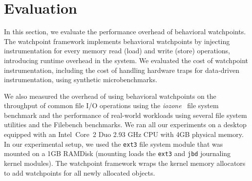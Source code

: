 \section{Evaluation}\label{sec:approach_eval}
In this section, we evaluate the performance overhead of behavioral watchpoints. The watchpoint framework implements behavioral watchpoints by injecting instrumentation for every memory read (load) and write (store) operations, introducing runtime overhead in the system. We evaluated the cost of watchpoint instrumentation, including the cost of handling hardware traps for data-driven instrumentation, using synthetic microbenchmarks. 



We also measured the overhead of using behavioral watchpoints on the throughput of common file I/O operations using the \emph{iozone}~\cite{citeulike:919086} file system benchmark and the performance of real-world workloads using several file system utilities and the Filebench benchmarks. 
We ran all our experiments on a desktop equipped with an Intel\textregistered\ Core\texttrademark\ 2 Duo 2.93 GHz CPU with 4GB physical memory. In our experimental setup, we used the \texttt{ext3} file system module that was mounted on a 1GB RAMDisk (mounting loads the \texttt{ext3} and \texttt{jbd} journaling kernel modules). The watchpoint framework wraps the kernel memory allocators to add watchpoints for all newly allocated objects.








